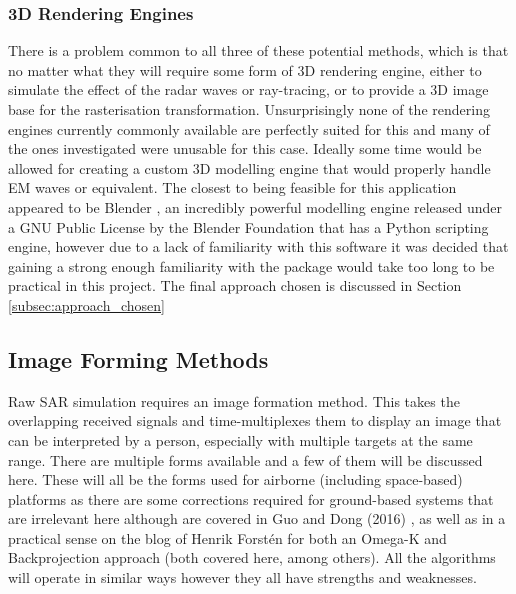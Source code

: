 \subsubsection{3D Rendering Engines}
\label{sec:3drender}
There is a problem common to all three of these potential methods, which is that no matter what they will require some form of 3D rendering engine, either to simulate the effect of the radar waves or ray-tracing, or to provide a 3D image base for the rasterisation transformation. Unsurprisingly none of the rendering engines currently commonly available are perfectly suited for this and many of the ones investigated were unusable for this case. Ideally some time would be allowed for creating a custom 3D modelling engine that would properly handle EM waves or equivalent. The closest to being feasible for this application appeared to be Blender \cite{foundationBlenderOrgHome}, an incredibly powerful modelling engine released under a GNU Public License by the Blender Foundation that has a Python scripting engine, however due to a lack of familiarity with this software it was decided that gaining a strong enough familiarity with the package would take too long to be practical in this project. The final approach chosen is discussed in Section \ref{subsec:approach_chosen}
\subsection{Image Forming Methods}
Raw SAR simulation requires an image formation method. This takes the overlapping received signals and time-multiplexes them to display an image that can be interpreted by a person, especially with multiple targets at the same range. There are multiple forms available and a few of them will be discussed here. These will all be the forms used for airborne (including space-based) platforms as there are some corrections required for ground-based systems that are irrelevant here although are covered in Guo and Dong (2016) \cite{guoModifiedOmegaKAlgorithm2016}, as well as in a practical sense on the blog of Henrik Forstén for both an Omega-K \cite{forstenSyntheticapertureRadarImaging2019} and Backprojection \cite{forstenBackprojectionBackpropagation2019} approach (both covered here, among others). All the algorithms will operate in similar ways however they all have strengths and weaknesses. 
